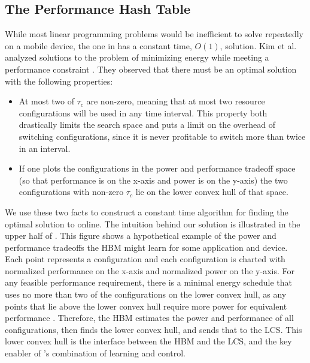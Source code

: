 \subsection{The Performance Hash Table}
While most linear programming problems would be inefficient to solve
repeatedly on a mobile device, the one in  has a
constant time, $O(1)$, solution.  Kim et al. analyzed solutions to the
problem of minimizing energy while meeting a performance constraint
\cite{kim-cpsna}.  They observed that there must be an optimal
solution with the following properties:
\begin{itemize}
\item At most two of $\tau_c$ are non-zero, meaning that at most two
  resource configurations will be used in any time interval.  This
  property both drastically limits the search space and puts a limit
  on the overhead of switching configurations, since it is never
  profitable to switch more than twice in an interval.
\item If one plots the configurations in the power and performance
  tradeoff space (so that performance is on the x-axis and power is on
  the y-axis) the two configurations with non-zero $\tau_c$ lie on the
  lower convex hull of that space.
\end{itemize}
We use these two facts to construct a constant time algorithm for
finding the optimal solution to  online.  The
intuition behind our solution is illustrated in the upper half of
.  This figure shows a hypothetical example of the power
and performance tradeoffs the HBM might learn for some application and
device.  Each point represents a configuration and each configuration
is charted with normalized performance on the x-axis and normalized
power on the y-axis.  For any feasible performance requirement, there
is a minimal energy schedule that uses no more than two of the
configurations on the lower convex hull, as any points that lie above
the lower convex hull require more power for equivalent performance
\cite{kim-cpsna}.  Therefore, the HBM estimates the power and
performance of all configurations, then finds the lower convex hull,
and sends that to the LCS.  This lower convex hull is the interface
between the HBM and the LCS, and the key enabler of \SYSTEM{}'s
combination of learning and control.




